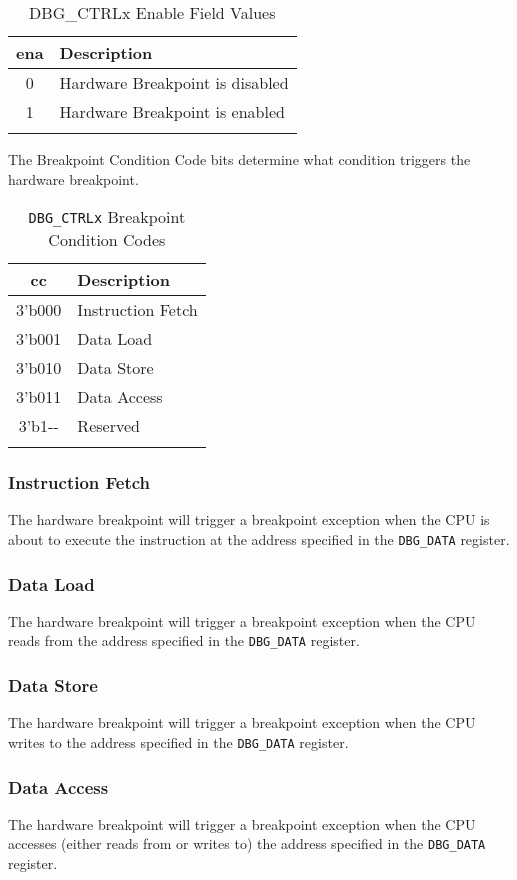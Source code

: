 \begin{longtable}[]{@{}cl@{}}
\toprule
ena & Description\tabularnewline
\midrule
\endhead
0 & Hardware Breakpoint is disabled\tabularnewline
1 & Hardware Breakpoint is enabled\tabularnewline
\bottomrule
\caption{DBG\_CTRLx Enable Field Values}
\end{longtable}


The Breakpoint Condition Code bits determine what condition triggers the
hardware breakpoint.

\begin{longtable}[]{@{}cl@{}}
\toprule
cc & Description\tabularnewline
\midrule
\endhead
3'b000 & Instruction Fetch\tabularnewline
3'b001 & Data Load\tabularnewline
3'b010 & Data Store\tabularnewline
3'b011 & Data Access\tabularnewline
3'b1-\/- & Reserved\tabularnewline
\bottomrule
\caption{\texttt{DBG\_CTRLx} Breakpoint Condition Codes}
\end{longtable} 

\subsubsection{Instruction Fetch}\label{instruction-fetch}

The hardware breakpoint will trigger a breakpoint exception when the CPU
is about to execute the instruction at the address specified in the
\texttt{DBG\_DATA} register.

\subsubsection{Data Load}\label{data-load}

The hardware breakpoint will trigger a breakpoint exception when the CPU
reads from the address specified in the \texttt{DBG\_DATA} register.

\subsubsection{Data Store}\label{data-store}

The hardware breakpoint will trigger a breakpoint exception when the CPU
writes to the address specified in the \texttt{DBG\_DATA} register.

\subsubsection{Data Access}\label{data-access}

The hardware breakpoint will trigger a breakpoint exception when the CPU
accesses (either reads from or writes to) the address specified in the
\texttt{DBG\_DATA} register.

